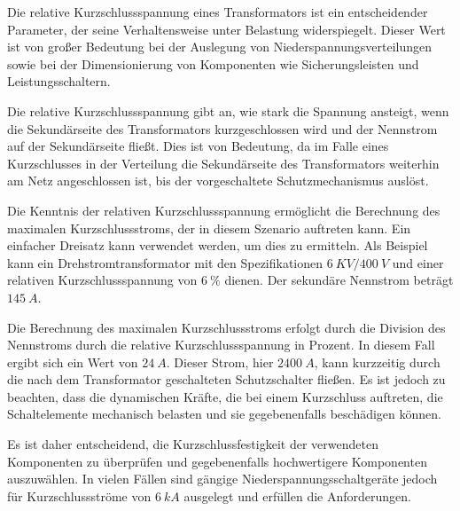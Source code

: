 \begin{enumerate}[label=\alph*)]
        Die relative Kurzschlussspannung eines Transformators ist ein entscheidender
        Parameter, der seine Verhaltensweise unter Belastung widerspiegelt. Dieser Wert
        ist von großer Bedeutung bei der Auslegung von Niederspannungsverteilungen
        sowie bei der Dimensionierung von Komponenten wie Sicherungsleisten und
        Leistungsschaltern.

        Die relative Kurzschlussspannung gibt an, wie stark die Spannung ansteigt, wenn
        die Sekundärseite des Transformators kurzgeschlossen wird und der Nennstrom auf
        der Sekundärseite fließt. Dies ist von Bedeutung, da im Falle eines
        Kurzschlusses in der Verteilung die Sekundärseite des Transformators weiterhin
        am Netz angeschlossen ist, bis der vorgeschaltete Schutzmechanismus auslöst.

        Die Kenntnis der relativen Kurzschlussspannung ermöglicht die Berechnung des
        maximalen Kurzschlussstroms, der in diesem Szenario auftreten kann. Ein
        einfacher Dreisatz kann verwendet werden, um dies zu ermitteln. Als Beispiel
        kann ein Drehstromtransformator mit den Spezifikationen $6\ KV / 400\ V$ und
        einer relativen Kurzschlussspannung von $6\ \%$ dienen. Der sekundäre Nennstrom
        beträgt $145\ A$.

        Die Berechnung des maximalen Kurzschlussstroms erfolgt durch die Division des
        Nennstroms durch die relative Kurzschlussspannung in Prozent. In diesem Fall
        ergibt sich ein Wert von $24\ A$. Dieser Strom, hier $2400\ A$, kann kurzzeitig
        durch die nach dem Transformator geschalteten Schutzschalter fließen. Es ist
        jedoch zu beachten, dass die dynamischen Kräfte, die bei einem Kurzschluss
        auftreten, die Schaltelemente mechanisch belasten und sie gegebenenfalls
        beschädigen können.

        Es ist daher entscheidend, die Kurzschlussfestigkeit der verwendeten
        Komponenten zu überprüfen und gegebenenfalls hochwertigere Komponenten
        auszuwählen. In vielen Fällen sind gängige Niederspannungsschaltgeräte jedoch
        für Kurzschlussströme von $6\ kA$ ausgelegt und erfüllen die Anforderungen.

\end{enumerate}

